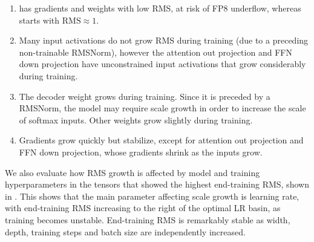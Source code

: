\begin{enumerate}
    \item \mup{} has gradients and weights with low RMS, at risk of FP8 underflow, whereas \umup{} starts with $\mathrm{RMS} \approx 1$.
    \item Many input activations do not grow RMS during training (due to a preceding non-trainable RMSNorm), however the attention out projection and FFN down projection have unconstrained input activations that grow considerably during training.
    \item The decoder weight grows during training. Since it is preceded by a RMSNorm, the model may require scale growth in order to increase the scale of softmax inputs. Other weights grow slightly during training.
    \item Gradients grow quickly but stabilize, except for attention out projection and FFN down projection, whose gradients shrink as the inputs grow.
\end{enumerate}

We also evaluate how RMS growth is affected by model and training hyperparameters in the tensors that showed the highest end-training RMS, shown in . This shows that the main parameter affecting scale growth is learning rate, with end-training RMS increasing to the right of the optimal LR basin, as training becomes unstable. End-training RMS is remarkably stable as width, depth, training steps and batch size are independently increased.

